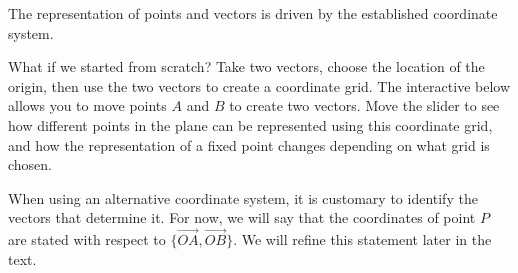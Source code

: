 \documentclass{ximera}
\begin{document}
The representation of points and vectors is driven by the established coordinate system.

What if we started from scratch?  Take two vectors, choose the location of the origin, then use the two vectors to create a coordinate grid.  The interactive below allows you to move points $A$ and $B$ to create two vectors.  Move the slider to see how different points in the plane can be represented using this coordinate grid, and how the representation of a fixed point changes depending on what grid is chosen.

\begin{center}
\end{center}

When using an alternative coordinate system, it is customary to identify the vectors that determine it.  For now, we will say that the coordinates of point $P$ are stated with respect to $\{\overrightarrow{OA}, \overrightarrow{OB}\}$.  We will refine this statement later in the text.
\end{document}
